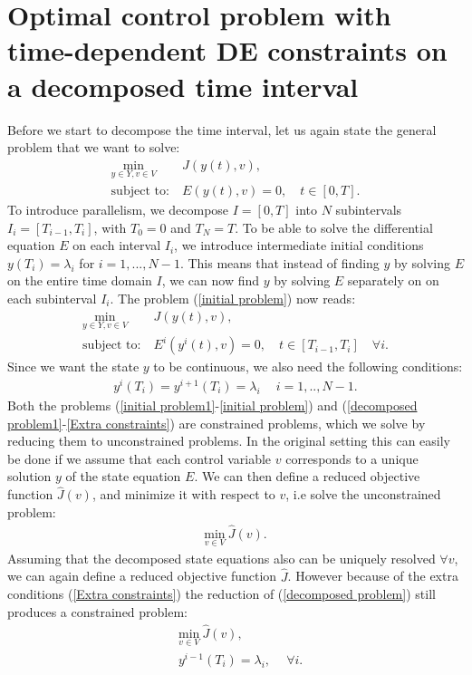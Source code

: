 \section{Optimal control problem with time-dependent DE constraints on a decomposed time interval} \label{decomp_sec}
Before we start to decompose the time interval, let us again state the general problem that we want to solve:
\begin{align}
\underset{y\in Y,v\in V}{\text{min}} \ &J(y(t),v), \label{initial problem1}\\
\textrm{subject to:} \ &E(y(t),v)=0, \quad t\in [0,T]. \label{initial problem}
\end{align}
To introduce parallelism, we decompose $I=[0,T]$ into $N$ subintervals $I_i=[T_{i-1},T_i]$, with $T_0=0$ and $T_N=T$. To be able to solve the differential equation $E$ on each interval $I_i$, we introduce intermediate initial conditions $y(T_i)=\lambda_i$ for $i=1,...,N-1$. This means that instead of finding $y$ by solving $E$ on the entire time domain $I$, we can now find $y$ by solving $E$ separately on on each subinterval $I_i$. The problem (\ref{initial problem}) now reads:
\begin{align}
\underset{y\in Y,v\in V}{\text{min}} \ &J(y(t),v),  \label{decomposed problem1}\\
\textrm{subject to:} \ &E^i(y^i(t),v)=0, \quad t\in [T_{i-1},T_i] \quad \forall i. \label{decomposed problem}
\end{align} 
Since we want the state $y$ to be continuous, we also need the following conditions:
\begin{align}
y^{i}(T_i)=y^{i+1}(T_i)=\lambda_i \quad \ i=1,..,N-1. \label{Extra constraints}
\end{align} 
Both the problems (\ref{initial problem1}-\ref{initial problem}) and (\ref{decomposed problem1}-\ref{Extra constraints}) are constrained problems, which we solve by reducing them to unconstrained problems. In the original setting this can easily be done if we assume that each control variable $v$ corresponds to a unique solution $y$ of the state equation $E$. We can then define a reduced objective function $\hat{J}(v)$, and minimize it with respect to $v$, i.e solve the unconstrained problem:
\begin{align*}
\underset{v\in V}{\text{min}} \ \hat J(v).
\end{align*} 
Assuming that the decomposed state equations also can be uniquely resolved $\forall v$, we can again define a reduced objective function  $\hat{J}$. However because of the extra conditions (\ref{Extra constraints}) the reduction of (\ref{decomposed problem}) still produces a constrained problem:
\begin{align}
&\underset{v\in V}{\text{min}} \ \hat J(v), \label{constrained reduced j}\\
&y^{i-1}(T_i)=\lambda_i, \ \quad \forall i. \label{constrained reduced}
\end{align} 
